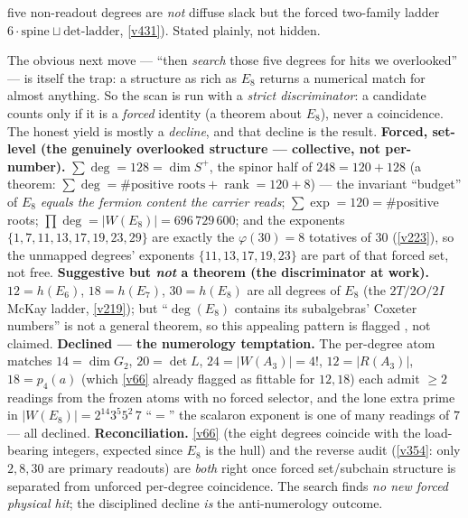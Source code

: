 \documentclass[11pt,a4paper]{article}
\begin{document}
\begin{winbox}
five non-readout degrees are \emph{not} diffuse slack but the forced two-family ladder $6\cdot\text{spine}\sqcup\text{det-ladder}$, \vref{v431}). Stated plainly, not hidden.
\end{winbox}

\begin{winbox}
The obvious next move --- ``then \emph{search} those five degrees for hits we overlooked'' --- is itself the trap: a structure as rich as $E_8$ returns a numerical match for almost anything. So the scan is run with a \emph{strict discriminator}: a candidate counts only if it is a \emph{forced} identity (a theorem about $E_8$), never a coincidence. The honest yield is mostly a \emph{decline}, and that decline is the result. \textbf{Forced, set-level (the genuinely overlooked structure --- collective, not per-number).} $\sum\deg = 128 = \dim S^+$, the spinor half of $248 = 120 + 128$ (a theorem: $\sum\deg = \#\text{positive roots} + \operatorname{rank} = 120 + 8$) --- the invariant ``budget'' of $E_8$ \emph{equals the fermion content the carrier reads}; $\sum\exp = 120 = \#$positive roots; $\prod\deg = |W(E_8)| = 696{\,}729{\,}600$; and the exponents $\{1,7,11,13,17,19,23,29\}$ are exactly the $\varphi(30)=8$ totatives of $30$ (\vref{v223}), so the unmapped degrees' exponents $\{11,13,17,19,23\}$ are part of that forced set, not free. \textbf{Suggestive but \emph{not} a theorem (the discriminator at work).} $12 = h(E_6)$, $18 = h(E_7)$, $30 = h(E_8)$ are all degrees of $E_8$ (the $2T/2O/2I$ McKay ladder, \vref{v219}); but ``$\deg(E_8)$ contains its subalgebras' Coxeter numbers'' is not a general theorem, so this appealing pattern is flagged \mC, not claimed. \textbf{Declined --- the numerology temptation.} The per-degree atom matches $14{=}\dim G_2$, $20{=}\det L$, $24{=}|W(A_3)|{=}4!$, $12{=}|R(A_3)|$, $18{=}p_4(a)$ (which \vref{v66} already flagged as fittable for $12,18$) each admit $\ge2$ readings from the frozen atoms with no forced selector, and the lone extra prime in $|W(E_8)| = 2^{14}3^5 5^2\,7$ ``$=$'' the scalaron exponent is one of many readings of $7$ --- all declined. \textbf{Reconciliation.} \vref{v66} (the eight degrees coincide with the load-bearing integers, expected since $E_8$ is the hull) and the reverse audit (\vref{v354}: only $2,8,30$ are primary readouts) are \emph{both} right once forced set/subchain structure is separated from unforced per-degree coincidence. The search finds \emph{no new forced physical hit}; the disciplined decline \emph{is} the anti-numerology outcome.
\end{winbox}
\end{document}
